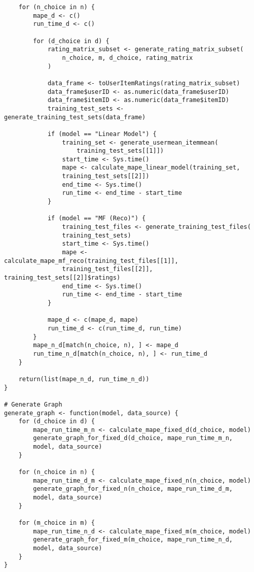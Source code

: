 \documentclass[12pt]{article}
\begin{document}
\begin{singlespace}
\begin{verbatim}
    for (n_choice in n) {
        mape_d <- c()
        run_time_d <- c()

        for (d_choice in d) {
            rating_matrix_subset <- generate_rating_matrix_subset(
                n_choice, m, d_choice, rating_matrix
            )

            data_frame <- toUserItemRatings(rating_matrix_subset)
            data_frame$userID <- as.numeric(data_frame$userID)
            data_frame$itemID <- as.numeric(data_frame$itemID)
            training_test_sets <- generate_training_test_sets(data_frame)

            if (model == "Linear Model") {
                training_set <- generate_usermean_itemmean(
                    training_test_sets[[1]])
                start_time <- Sys.time()
                mape <- calculate_mape_linear_model(training_set,
                training_test_sets[[2]])
                end_time <- Sys.time()
                run_time <- end_time - start_time
            }

            if (model == "MF (Reco)") {
                training_test_files <- generate_training_test_files(
                training_test_sets)
                start_time <- Sys.time()
                mape <- calculate_mape_mf_reco(training_test_files[[1]],
                training_test_files[[2]], training_test_sets[[2]]$ratings)
                end_time <- Sys.time()
                run_time <- end_time - start_time
            }

            mape_d <- c(mape_d, mape)
            run_time_d <- c(run_time_d, run_time)
        }
        mape_n_d[match(n_choice, n), ] <- mape_d
        run_time_n_d[match(n_choice, n), ] <- run_time_d
    }

    return(list(mape_n_d, run_time_n_d))
}

# Generate Graph
generate_graph <- function(model, data_source) {
    for (d_choice in d) {
        mape_run_time_m_n <- calculate_mape_fixed_d(d_choice, model)
        generate_graph_for_fixed_d(d_choice, mape_run_time_m_n,
        model, data_source)
    }

    for (n_choice in n) {
        mape_run_time_d_m <- calculate_mape_fixed_n(n_choice, model)
        generate_graph_for_fixed_n(n_choice, mape_run_time_d_m,
        model, data_source)
    }

    for (m_choice in m) {
        mape_run_time_n_d <- calculate_mape_fixed_m(m_choice, model)
        generate_graph_for_fixed_m(m_choice, mape_run_time_n_d,
        model, data_source)
    }
}


\end{verbatim}
\end{singlespace}
\end{document}
